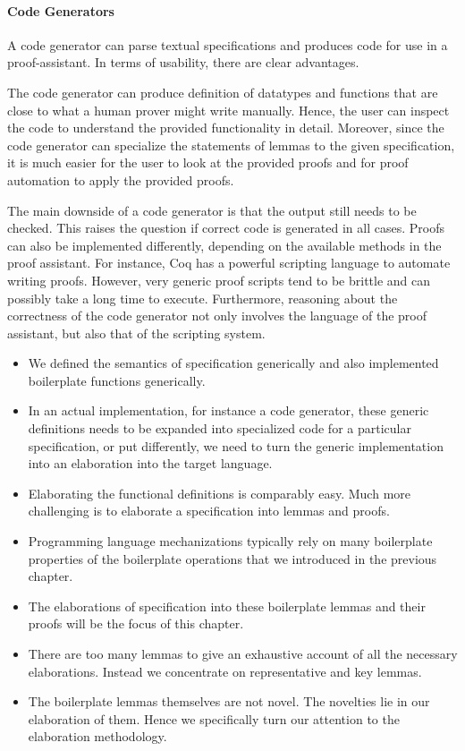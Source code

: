 \paragraph{Code Generators}
A code generator can parse textual \Knot specifications and produces code for
use in a proof-assistant. In terms of usability, there are clear advantages.

The code generator can produce definition of datatypes and functions that are
close to what a human prover might write manually. Hence, the user can inspect
the code to understand the provided functionality in detail. Moreover, since the
code generator can specialize the statements of lemmas to the given
specification, it is much easier for the user to look at the provided proofs
and for proof automation to apply the provided proofs.

The main downside of a code generator is that the output still needs to be
checked. This raises the question if correct code is generated in all cases.
Proofs can also be implemented differently, depending on the available methods
in the proof assistant. For instance, Coq has a powerful scripting language to
automate writing proofs. However, very generic proof scripts tend to be brittle
and can possibly take a long time to execute. Furthermore, reasoning about the
correctness of the code generator not only involves the language of the proof
assistant, but also that of the scripting system.




\begin{itemize}
\item We defined the semantics of \Knot specification generically and also
  implemented boilerplate functions generically.

\item In an actual implementation, for instance a code generator, these generic
  definitions needs to be expanded into specialized code for a particular
  specification, or put differently, we need to turn the generic implementation
  into an elaboration into the target language.

\item Elaborating the functional definitions is comparably easy. Much more
  challenging is to elaborate a specification into lemmas and proofs.

\item Programming language mechanizations typically rely on many boilerplate
  properties of the boilerplate operations that we introduced in the previous
  chapter.

\item The elaborations of specification into these boilerplate lemmas and their
  proofs will be the focus of this chapter.

\item There are too many lemmas to give an exhaustive account of all the
  necessary elaborations. Instead we concentrate on representative and key
  lemmas.

\item The boilerplate lemmas themselves are not novel. The novelties lie in our
  elaboration of them. Hence we specifically turn our attention to the
  elaboration methodology.
\end{itemize}

